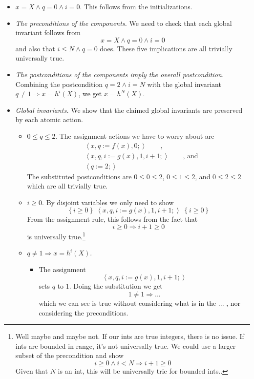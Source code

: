 \documentclass[muchmore,11pt]{article}%
\begin{document}
\begin{itemize}
\item $x=X\wedge q=0\wedge i=0$. This follows from the initializations.

\item \emph{The preconditions of the components. }We need to check that each
global invariant follows from%
\[
x=X\wedge q=0\wedge i=0
\]
and also that $i\leq N\wedge q=0$ does. These five implications are all
trivially universally true.

\item \emph{The postconditions of the components imply the overall
postcondition.} Combining the postcondition $q=2\wedge i=N$ with the global
invariant $q\neq1\Rightarrow x=h^{i}(X)$, we get $x=h^{N}(X)$.

\item \emph{Global invariants.} We show that the claimed global invariants are
preserved by each atomic action.

\begin{itemize}
\item $0\leq q\leq2$. The assignment actions we have to worry about are%
\begin{align*}
&  \left\langle x,q:=f(x),0;\right\rangle \qquad\text{,}\\
&  \left\langle x,q,i:=g(x),1,i+1;\right\rangle \qquad\text{, and}\\
&  \left\langle q:=2;\right\rangle
\end{align*}
The substituted postconditions are $0\leq0\leq2$, $0\leq1\leq2$, and
$0\leq2\leq2$ which are all trivially true.

\item $i\geq0$. By disjoint variables we only need to show%
\[
\left\{  i\geq0\right\}  \;\left\langle x,q,i:=g(x),1,i+1;\right\rangle
\;\left\{  i\geq0\right\}
\]
From the assignment rule, this follows from the fact that%
\[
i\geq0\Rightarrow i+1\geq0
\]
is universally true.\footnote{Well maybe and maybe not. If our \textsf{int}s
are true integers, there is no issue. If ints are bounded in range, it's not
universally true. We could use a larger subset of the precondition and show%
\[
i\geq0\wedge i<N\Rightarrow i+1\geq0
\]
Given that $N$ is an \textsf{int}, this will be universally trie for bounded
\textsf{int}s..}

\item $q\neq1\Rightarrow x=h^{i}(X)$.

\begin{itemize}
\item The assignment%
\[
\left\langle x,q,i:=g(x),1,i+1;\right\rangle
\]
sets $q$ to 1. Doing the substitution we get%
\[
1\neq1\Rightarrow...
\]
which we can see is true without considering what is in the ... , nor
considering the preconditions.


\end{itemize}
\end{itemize}
\end{itemize}
\end{document}
